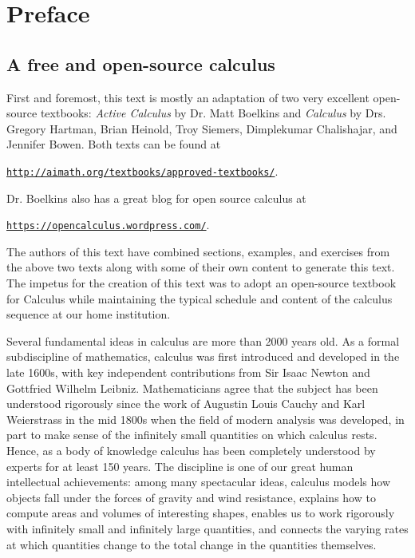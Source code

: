 \chapter*{Preface}

\section*{A free and open-source calculus \ } 

First and foremost, this text is mostly an adaptation of two very excellent open-source textbooks:  {\em Active Calculus} by Dr. Matt Boelkins and {\em \apex Calculus} by Drs. Gregory Hartman, Brian Heinold, Troy Siemers, Dimplekumar Chalishajar, and Jennifer Bowen.  Both texts can be found at
\begin{center} \href{http://aimath.org/textbooks/approved-textbooks/}
{\texttt{http://aimath.org/textbooks/approved-textbooks/}}. \end{center} 
Dr. Boelkins also has a great blog for open source calculus at
\begin{center} \href{https://opencalculus.wordpress.com/}
{\texttt{https://opencalculus.wordpress.com/}}. \end{center} 
The authors of this text have combined sections, examples, and exercises from the above two texts along with some of their own content to generate this text.  The impetus for the creation of this text was to adopt an open-source textbook for Calculus while maintaining the typical schedule and content of the calculus sequence at our home institution.

Several fundamental ideas in calculus are more than 2000 years old.  As a formal subdiscipline of mathematics, calculus was first introduced and developed in the late 1600s, with key independent contributions from Sir Isaac Newton and Gottfried Wilhelm Leibniz.  Mathematicians agree that the subject has been understood rigorously since the work of Augustin Louis Cauchy and Karl Weierstrass in the mid 1800s when the field of modern analysis was developed, in part to make sense of the infinitely small quantities on which calculus rests.  Hence, as a body of knowledge calculus has been completely understood by experts for at least 150 years.  The discipline is one of our great human intellectual achievements:  among many spectacular ideas, calculus models how objects fall under the forces of gravity and wind resistance, explains how to compute areas and volumes of interesting shapes, enables us to work rigorously with infinitely small and infinitely large quantities, and connects the varying rates at which quantities change to the total change in the quantities themselves.

